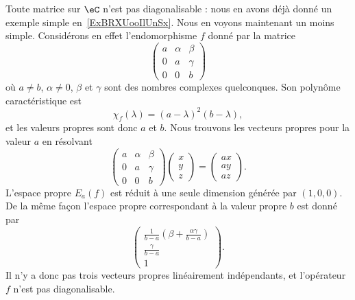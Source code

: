 \begin{remark}  \label{RemBOGooCLMwyb}
    Toute matrice sur \( \eC\) n'est pas diagonalisable : nous en avons déjà donné un exemple simple en~\ref{ExBRXUooIlUnSx}. Nous en voyons maintenant un moins simple. Considérons en effet l'endomorphisme \( f\) donné par la matrice
    \begin{equation}
        \begin{pmatrix}
            a&    \alpha    &   \beta    \\
            0    &   a    &   \gamma    \\
            0    &   0    &   b
        \end{pmatrix}
    \end{equation}
    où \( a\neq b\), \( \alpha\neq 0\), \( \beta\) et \( \gamma\) sont des nombres complexes quelconques.
    Son polynôme caractéristique est
    \begin{equation}
        \chi_f(\lambda)=(a-\lambda)^2(b-\lambda),
    \end{equation}
    et les valeurs propres sont donc \( a\) et \( b\). Nous trouvons les vecteurs propres pour la valeur \( a\) en résolvant
    \begin{equation}
        \begin{pmatrix}
            a    &   \alpha    &   \beta    \\
            0    &   a    &   \gamma    \\
            0    &   0    &   b
        \end{pmatrix}\begin{pmatrix}
            x    \\
            y    \\
            z
        \end{pmatrix}=\begin{pmatrix}
            ax    \\
            ay    \\
            az
        \end{pmatrix}.
    \end{equation}
    L'espace propre \( E_a(f)\) est réduit à une seule dimension générée par \( (1,0,0)\). De la même façon l'espace propre correspondant à la valeur propre \( b\) est donné par
    \begin{equation}
        \begin{pmatrix}
            \frac{1}{ b-a }\left( \beta+\frac{ \alpha\gamma }{ b-a } \right)    \\
            \frac{ \gamma }{ b-a }    \\
            1
        \end{pmatrix}.
    \end{equation}
    Il n'y a donc pas trois vecteurs propres linéairement indépendants, et l'opérateur \( f\) n'est pas diagonalisable.


\end{remark}
